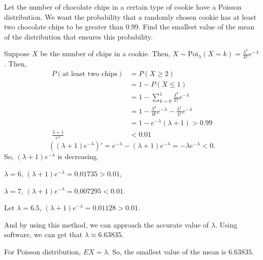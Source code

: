 \documentclass[14pt]{elegantbook}
\begin{document}
    \setcounter{exer}{6}
    \begin{exercise}
        Let the number of chocolate chips in a certain type of cookie have a Poisson distribution. We want the probability that a randomly chosen cookie has at least two chocolate chips to be greater than $0.99$. Find the smallest value of the mean of the distribution that ensures this probability. 
    \end{exercise}

    \begin{solution}
        Suppose $X$ be the number of chips in a cookie. Then, $X\sim\text{Poi}_\lambda(X=k)=\frac{\lambda^k}{k!}e^{-\lambda}$. Then, 
        \begin{align*}
            P(\text{at least two chips})&=P(X\geq 2)\\
            &=1-P(X\leq 1)\\
            &=1-\sum_{k=0}^1\frac{\lambda^k}{k!}e^{-\lambda}\\ 
            &=1-\frac{\lambda^0}{0!}e^{-\lambda}-\frac{\lambda^1}{1!}e^{-\lambda}\\
            &=1-e^{-\lambda}(\lambda+1)>0.99\\
            \frac{\lambda+1}{e^\lambda}&<0.01
        \end{align*}
        \[\left((\lambda+1)e^{-\lambda}\right)'=e^{-\lambda}-(\lambda+1)e^{-\lambda}=-\lambda e^{-\lambda}<0. \]
        So, $(\lambda+1)e^{-\lambda}$ is decreasing. 
        
        $\lambda=6$, $(\lambda+1)e^{-\lambda}=0.01735>0.01$, 
        
        $\lambda=7$, $(\lambda+1)e^{-\lambda}=0.007295<0.01$. 
        
        Let $\lambda=6.5$, $(\lambda+1)e^{-\lambda}=0.01128>0.01$. 
        
        And by using this method, we can approach the accurate value of $\lambda$. Using software, we can get that $\lambda\approx 6.63835$. 

        For Poisson distribution, $EX=\lambda$. So, the smallest value of the mean is $6.63835$.
    \end{solution}
\end{document}

